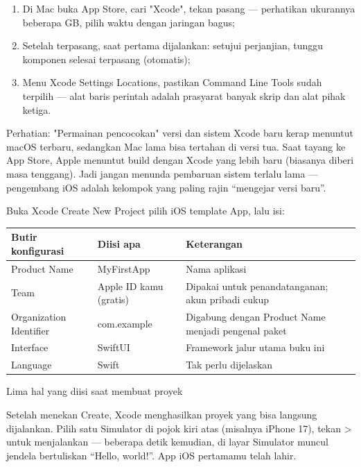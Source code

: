 \begin{enumerate}
  \item Di Mac buka App Store, cari "Xcode", tekan pasang — perhatikan ukurannya beberapa GB, pilih waktu dengan jaringan bagus;
  \item Setelah terpasang, saat pertama dijalankan: setujui perjanjian, tunggu komponen selesai terpasang (otomatis);
  \item Menu Xcode Settings Locations, pastikan Command Line Tools sudah terpilih — alat baris perintah adalah prasyarat banyak skrip dan alat pihak ketiga.
\end{enumerate}

\begin{tcbwarn}{Perhatian: "Permainan pencocokan" versi dan sistem}
Xcode baru kerap menuntut macOS terbaru, sedangkan Mac lama bisa tertahan di versi tua. Saat tayang ke App Store, Apple menuntut build dengan Xcode yang lebih baru (biasanya diberi masa tenggang). Jadi jangan menunda pembaruan sistem terlalu lama — pengembang iOS adalah kelompok yang paling rajin “mengejar versi baru”.

\end{tcbwarn}


Buka Xcode Create New Project pilih iOS template App, lalu isi:

\begin{center}
\begin{tabularx}{\linewidth}{|X|X|X|}
\hline
\textbf{Butir konfigurasi} & \textbf{Diisi apa} & \textbf{Keterangan} \tabularnewline
\hline
Product Name & MyFirstApp & Nama aplikasi \tabularnewline
Team & Apple ID kamu (gratis) & Dipakai untuk penandatanganan; akun pribadi cukup \tabularnewline
Organization Identifier & com.example & Digabung dengan Product Name menjadi pengenal paket \tabularnewline
Interface & SwiftUI & Framework jalur utama buku ini \tabularnewline
Language & Swift & Tak perlu dijelaskan \tabularnewline
\hline
\end{tabularx}
\end{center}

\begin{center}\small\color{gray}Lima hal yang diisi saat membuat proyek\end{center}

Setelah menekan Create, Xcode menghasilkan proyek yang bisa langsung dijalankan. Pilih satu Simulator di pojok kiri atas (misalnya iPhone 17), tekan > untuk menjalankan — beberapa detik kemudian, di layar Simulator muncul jendela bertuliskan “Hello, world!”. App iOS pertamamu telah lahir.

